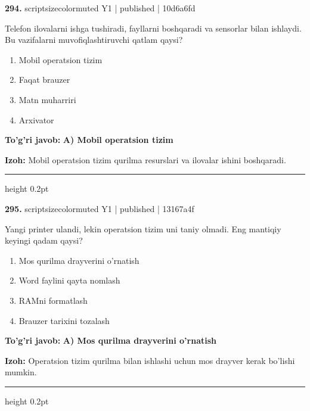 \documentclass[10pt,a4paper]{article}
\begin{document}
{\bfseries\sffamily\color{ink} 294.} {scriptsizecolor{muted} Y1 | published | 10d6a6fd}
\par
Telefon ilovalarni ishga tushiradi, fayllarni boshqaradi va sensorlar bilan ishlaydi. Bu vazifalarni muvofiqlashtiruvchi qatlam qaysi?
\begin{enumerate}[label=\Alph*),leftmargin=9mm]
\item Mobil operatsion tizim
\item Faqat brauzer
\item Matn muharriri
\item Arxivator
\end{enumerate}
\begin{tcolorbox}[enhanced,breakable,colback=teal!4,colframe=teal!60!black,boxrule=0.45pt,arc=1.2mm,left=2.7mm,right=2.7mm,top=1.8mm,bottom=1.8mm,before skip=2mm,after skip=2mm]
{\bfseries\sffamily\color{teal}To'g'ri javob:} \textbf{A) Mobil operatsion tizim}
\par\smallskip
{\bfseries Izoh:} Mobil operatsion tizim qurilma resurslari va ilovalar ishini boshqaradi.
\end{tcolorbox}
\vspace{2mm}\hrule height 0.2pt\vspace{3mm}

{\bfseries\sffamily\color{ink} 295.} {scriptsizecolor{muted} Y1 | published | 13167a4f}
\par
Yangi printer ulandi, lekin operatsion tizim uni taniy olmadi. Eng mantiqiy keyingi qadam qaysi?
\begin{enumerate}[label=\Alph*),leftmargin=9mm]
\item Mos qurilma drayverini o'rnatish
\item Word faylini qayta nomlash
\item RAMni formatlash
\item Brauzer tarixini tozalash
\end{enumerate}
\begin{tcolorbox}[enhanced,breakable,colback=teal!4,colframe=teal!60!black,boxrule=0.45pt,arc=1.2mm,left=2.7mm,right=2.7mm,top=1.8mm,bottom=1.8mm,before skip=2mm,after skip=2mm]
{\bfseries\sffamily\color{teal}To'g'ri javob:} \textbf{A) Mos qurilma drayverini o'rnatish}
\par\smallskip
{\bfseries Izoh:} Operatsion tizim qurilma bilan ishlashi uchun mos drayver kerak bo'lishi mumkin.
\end{tcolorbox}
\vspace{2mm}\hrule height 0.2pt\vspace{3mm}
\end{document}
